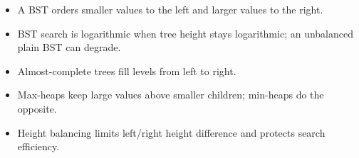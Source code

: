 \begin{chapterrecap}
\begin{itemize}
  \item A BST orders smaller values to the left and larger values to the right.
  \item BST search is logarithmic when tree height stays logarithmic; an unbalanced plain BST can degrade.
  \item Almost-complete trees fill levels from left to right.
  \item Max-heaps keep large values above smaller children; min-heaps do the opposite.
  \item Height balancing limits left/right height difference and protects search efficiency.
\end{itemize}
\end{chapterrecap}



